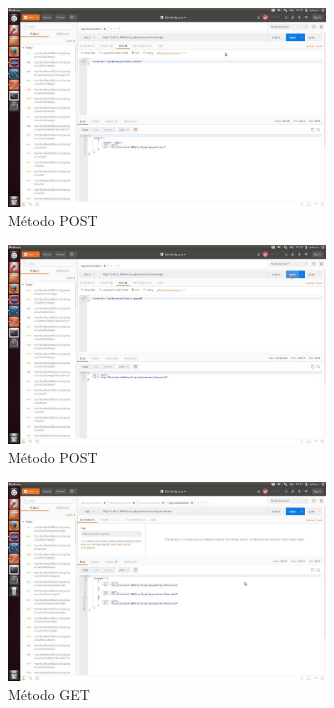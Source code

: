 \documentclass[12pt,a4paper, spanish]{article}
\begin{document}
\begin{figure}[H]
	\centering
	\includegraphics[width=0.75\textwidth]{images/captura21.jpg}
	\caption{Método POST}
\end{figure}

\begin{figure}[H]
	\centering
	\includegraphics[width=0.75\textwidth]{images/captura22.jpg}
	\caption{Método POST}
\end{figure}

\begin{figure}[H]
	\centering
	\includegraphics[width=0.75\textwidth]{images/captura23.jpg}
	\caption{Método GET}
\end{figure}
\end{document}
